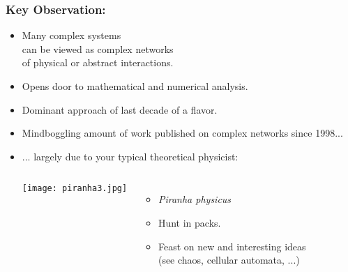 \begin{frame}
  \frametitle{Key Observation:}

  \begin{itemize}
  \item <1->
    Many \alert{complex systems}\\ 
    can be viewed as \alert{complex networks}\\
    of physical or abstract interactions.
  \item <2->
    Opens door to mathematical and numerical analysis.
  \item <3-> 
    Dominant approach of last decade of 
    a  flavor.
  \item <4-> 
    Mindboggling amount of work published 
    on complex networks since 1998...
  \item <5-> 
    ... largely due to your typical theoretical physicist:
    \begin{overprint}
      \smallskip
      \begin{columns}
        \texttt{[image: piranha3.jpg]}
        \begin{itemize}
        \item \textit{Piranha physicus}
        \item<7-> Hunt in packs.
        \item<8-> Feast on new and interesting ideas \\
          {\small (see chaos, cellular automata, ...)}
        \end{itemize}
      \end{columns}
    \end{overprint}
  \end{itemize}

\end{frame}


